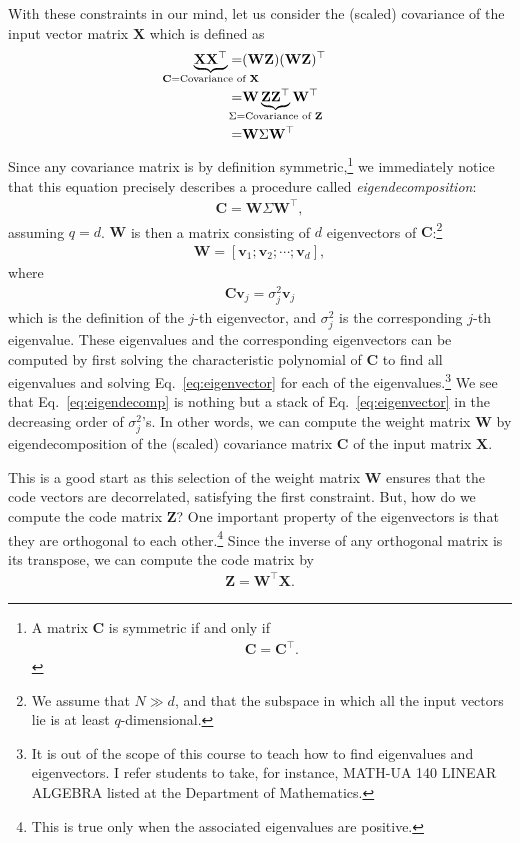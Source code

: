 \documentclass{report}
\newcommand{\vect}[1]{\mathbf{#1}}
\newcommand{\matr}[1]{\mathbf{#1}}
\newcommand{\vv}[0]{\vect{v}}
\newcommand{\mW}[0]{\matr{W}}
\newcommand{\mZ}[0]{\matr{Z}}
\newcommand{\mX}[0]{\matr{X}}
\newcommand{\mC}{\matr{C}}
\begin{document}
With these constraints in our mind, let us consider the (scaled) covariance of
the input vector matrix $\mX$ which is defined as
\begin{align*}
    \underbrace{\mX \mX^\top}_{\mathclap{\mC=\text{Covariance of }\mX}} =& 
    (\mW \mZ) (\mW \mZ)^\top \\
    =& \mW \underbrace{\mZ \mZ^\top}_{
\mathclap{\Sigma=\text{Covariance of }\mZ}} \mW^\top \\
=& \mW \Sigma \mW^\top
\end{align*}
Since any covariance matrix is by definition symmetric,\footnote{
    A matrix $\mC$ is symmetric if and only if
    \begin{align*}
        \mC = \mC^\top.
    \end{align*}
}
we immediately notice that this equation precisely describes a procedure called
{\it eigendecomposition}:
\begin{align}
    \label{eq:eigendecomp}
    \mC = \mW \Sigma \mW^\top,
\end{align}
assuming $q=d$. $\mW$ is then a matrix consisting of $d$ eigenvectors of
$\mC$:\footnote{
    We assume that $N \gg d$, and that the subspace in which all the input
    vectors lie is at least $q$-dimensional.
}
\begin{align*}
    \mW = \left[ \vv_1; \vv_2; \cdots; \vv_d \right],
\end{align*}
where
\begin{align}
    \label{eq:eigenvector}
    \mC \vv_j = \sigma_j^2 \vv_j
\end{align}
which is the definition of the $j$-th eigenvector, and $\sigma_j^2$ is the
corresponding $j$-th eigenvalue. These eigenvalues and the corresponding
eigenvectors can be computed by first solving the characteristic polynomial of
$\mC$ to find all eigenvalues and solving Eq.~\eqref{eq:eigenvector} for each of
the eigenvalues.\footnote{
    It is out of the scope of this course to teach how to find eigenvalues and
    eigenvectors. I refer students to take, for instance, MATH-UA 140 LINEAR
    ALGEBRA listed at the Department of Mathematics. 
}
We see that Eq.~\eqref{eq:eigendecomp} is nothing but a stack of
Eq.~\eqref{eq:eigenvector} in the decreasing order of $\sigma_j^2$'s.  In other
words, we can compute the weight matrix $\mW$ by eigendecomposition of the
(scaled) covariance matrix $\mC$ of the input matrix $\mX$.

This is a good start as this selection of the weight matrix $\mW$ ensures that
the code vectors are decorrelated, satisfying the first constraint. But, how do
we compute the code matrix $\mZ$? One important property of the eigenvectors is
that they are orthogonal to each other.\footnote{
    This is true only when the associated eigenvalues are positive. 
} Since the inverse of any orthogonal matrix is its transpose, we can compute
the code matrix by
\begin{align}
    \label{eq:pca_infer}
    \mZ = \mW^\top \mX.
\end{align}
\end{document}
